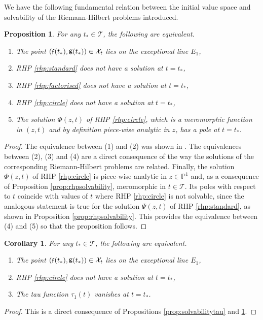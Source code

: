 \documentclass[a4paper,reqno,11pt]{amsart}
\numberwithin{equation}{section}
\numberwithin{figure}{section}
\theoremstyle{plain}
\newtheorem{corollary}[theorem]{Corollary}
\newtheorem{proposition}[theorem]{Proposition}
\theoremstyle{remark}
\DeclareMathOperator{\sff}{{\sf f}}
\DeclareMathOperator{\sfg}{{\sf g}}
\newcounter{rhp}
\numberwithin{rhp}{section}
\begin{document}
We have the following fundamental relation between the initial value space and solvability of the Riemann-Hilbert problems introduced.
\begin{proposition}\label{prop:solvabilityE8}
    For any $t_*\in \mathcal{T}$, the following are equivalent.
    \begin{enumerate}
        \item The point $(\sff(t_*),\sfg(t_*))\in \mathcal{X}_t$ lies on the exceptional line $E_1$,
        \item RHP \ref{rhp:standard} does not have a solution at $t=t_*$,
        \item RHP \ref{rhp:factorised} does not have a solution at $t=t_*$,
        \item RHP \ref{rhp:circle} does not have a solution at $t=t_*$,
        \item The solution $\Phi(z,t)$ of  RHP \ref{rhp:circle}, which is a meromorphic function in $(z,t)$ and by definition piece-wise analytic in $z$, has a pole at $t=t_*$.
    \end{enumerate}
\end{proposition}
\begin{proof}
    The equivalence between (1) and (2) was shown in \cite[Theorem 2.12]{joshi_rof_qpvi}. The equivalences between (2), (3) and (4) are a direct consequence of the way the solutions of the corresponding Riemann-Hilbert problems are related. Finally, the solution $\Phi(z,t)$ of RHP \ref{rhp:circle} is piece-wise analytic in $z\in\mathbb{P}^1$ and, as a consequence of Proposition \ref{prop:rhpsolvability}, meromorphic in $t\in \mathcal{T}$. Its poles with respect to $t$ coincide with values of $t$ where RHP \ref{rhp:circle} is not solvable, since the analogous statement is true for the solution $\Psi(z,t)$ of RHP \ref{rhp:standard}, as shown in Proposition \ref{prop:rhpsolvability}. This provides the equivalence between (4) and (5) so that the proposition follows.
\end{proof}


\begin{corollary}\label{cor:RHPSOLVE}
    For any $t_*\in \mathcal{T}$, the following are equivalent.
    \begin{enumerate}
        \item The point $(\sff(t_*),\sfg(t_*))\in \mathcal{X}_t$ lies on the exceptional line $E_1$,
        \item RHP \ref{rhp:circle} does not have a solution at $t=t_*$,
        \item The tau function $\tau_1(t)$ vanishes at $t=t_*$.
    \end{enumerate}
\end{corollary}
\begin{proof}
This is a direct consequence of Propositions \ref{prop:solvabilitytau} and \ref{prop:solvabilityE8}.
\end{proof}
\end{document}
